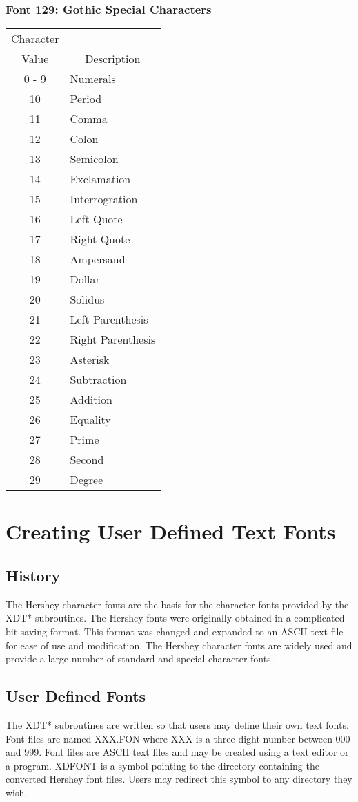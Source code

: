 \subsubsection{Font 129: Gothic Special Characters}
\begin{tabular}{|c|l|}
\hline
\multicolumn{1}{|c|}{Character}&\\
\multicolumn{1}{|c|}{Value}
&\multicolumn{1}{|c|}{Description}\\
\hline
0 - 9 & Numerals\\
10 & Period\\
11 & Comma\\
12 & Colon\\
13 & Semicolon\\
14 & Exclamation\\
15 & Interrogration\\
16 & Left Quote\\
17 & Right Quote\\
18 & Ampersand\\
19 & Dollar\\
20 & Solidus\\
21 & Left Parenthesis\\
22 & Right Parenthesis\\
23 & Asterisk\\
24 & Subtraction\\
25 & Addition\\
26 & Equality\\
27 & Prime\\
28 & Second\\
29 & Degree\\ \hline
\end{tabular}
\cleardoublepage
\section{Creating User Defined Text Fonts}
\subsection{History}
The Hershey character fonts are the basis for the character
fonts provided by the XDT* subroutines.  The Hershey fonts were
originally obtained in a complicated bit saving format.  This format
was changed and expanded to an ASCII text file for ease of use and
modification.  The Hershey character fonts are widely used and
provide a large number of standard and special character fonts.
\subsection{User Defined Fonts}
The XDT* subroutines are written so that users may define
their own text fonts.  Font files are named XXX.FON where XXX is a
three dight number between 000 and 999.  Font files are ASCII text
files and may be created using a text editor or a program.  XDFONT
is a symbol pointing to the directory containing the converted
Hershey font files.  Users may redirect this symbol to any directory
they wish.
